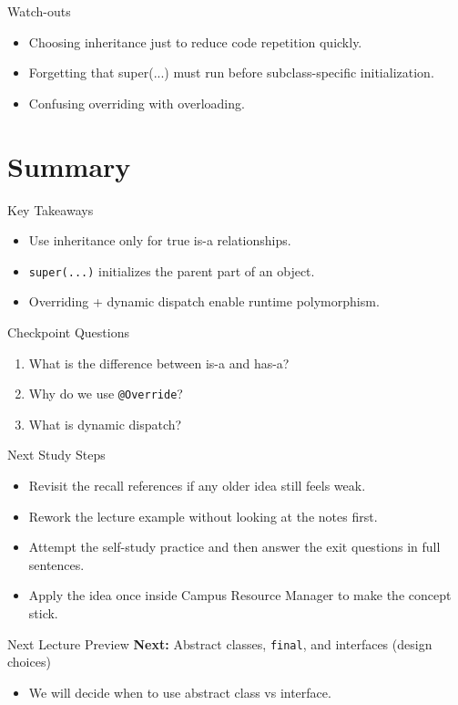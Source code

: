\documentclass{beamer}
\begin{document}
\begin{frame}{Watch-outs}
\begin{itemize}[<+->]
  \item Choosing inheritance just to reduce code repetition quickly.
  \item Forgetting that super(...) must run before subclass-specific initialization.
  \item Confusing overriding with overloading.
\end{itemize}
  \slidesources{\OOPSUnitIISources}
\end{frame}

\section{Summary}
\label{sec:summary}

\begin{frame}{Key Takeaways}
  \begin{itemize}[<+->]
    \item Use inheritance only for true is-a relationships.
    \item \texttt{super(...)} initializes the parent part of an object.
    \item Overriding + dynamic dispatch enable runtime polymorphism.
  \end{itemize}
  \slidesources{\OOPSUnitIISources}
\end{frame}

\begin{frame}{Checkpoint Questions}
  \begin{enumerate}[<+->]
    \item What is the difference between is-a and has-a?
    \item Why do we use \texttt{@Override}?
    \item What is dynamic dispatch?
  \end{enumerate}
  \slidesources{\OOPSUnitIISources}
\end{frame}

\begin{frame}{Next Study Steps}
\begin{itemize}[<+->]
  \item Revisit the recall references if any older idea still feels weak.
  \item Rework the lecture example without looking at the notes first.
  \item Attempt the self-study practice and then answer the exit questions in full sentences.
  \item Apply the idea once inside Campus Resource Manager to make the concept stick.
\end{itemize}
  \slidesources{\OOPSUnitIISources}
\end{frame}

\begin{frame}{Next Lecture Preview}
  \textbf{Next:} Abstract classes, \texttt{final}, and interfaces (design choices)
  \vspace{0.6em}
  \begin{itemize}[<+->]
    \item We will decide when to use abstract class vs interface.
  \end{itemize}
  \slidesources{\OOPSUnitIISources}
\end{frame}
\end{document}

